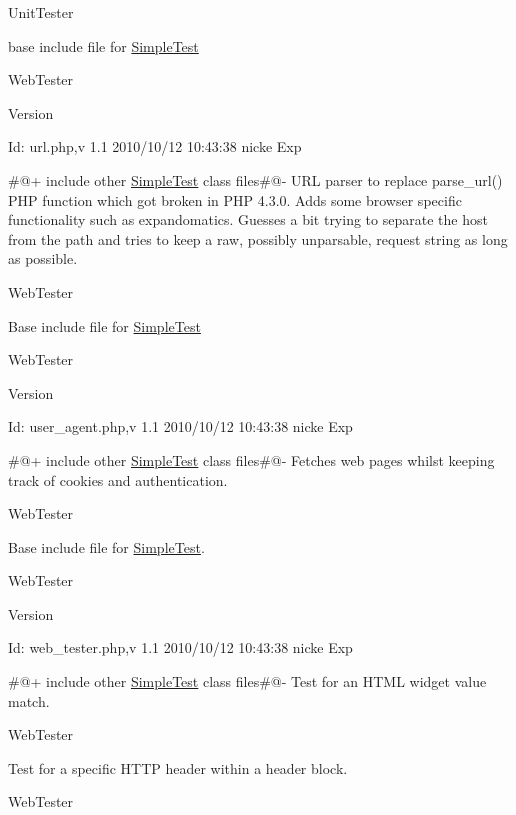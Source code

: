 UnitTester

base include file for \hyperlink{class_simple_test}{SimpleTest}

WebTester \begin{DoxyVersion}{Version}

\end{DoxyVersion}
\begin{DoxyParagraph}{Id:}
url.php,v 1.1 2010/10/12 10:43:38 nicke Exp 
\end{DoxyParagraph}


\#@+ include other \hyperlink{class_simple_test}{SimpleTest} class files\#@-\/ URL parser to replace parse\_\-url() PHP function which got broken in PHP 4.3.0. Adds some browser specific functionality such as expandomatics. Guesses a bit trying to separate the host from the path and tries to keep a raw, possibly unparsable, request string as long as possible.

WebTester

Base include file for \hyperlink{class_simple_test}{SimpleTest}

WebTester \begin{DoxyVersion}{Version}

\end{DoxyVersion}
\begin{DoxyParagraph}{Id:}
user\_\-agent.php,v 1.1 2010/10/12 10:43:38 nicke Exp 
\end{DoxyParagraph}


\#@+ include other \hyperlink{class_simple_test}{SimpleTest} class files\#@-\/ Fetches web pages whilst keeping track of cookies and authentication.

WebTester

Base include file for \hyperlink{class_simple_test}{SimpleTest}.

WebTester \begin{DoxyVersion}{Version}

\end{DoxyVersion}
\begin{DoxyParagraph}{Id:}
web\_\-tester.php,v 1.1 2010/10/12 10:43:38 nicke Exp 
\end{DoxyParagraph}


\#@+ include other \hyperlink{class_simple_test}{SimpleTest} class files\#@-\/ Test for an HTML widget value match.

WebTester

Test for a specific HTTP header within a header block.

WebTester

